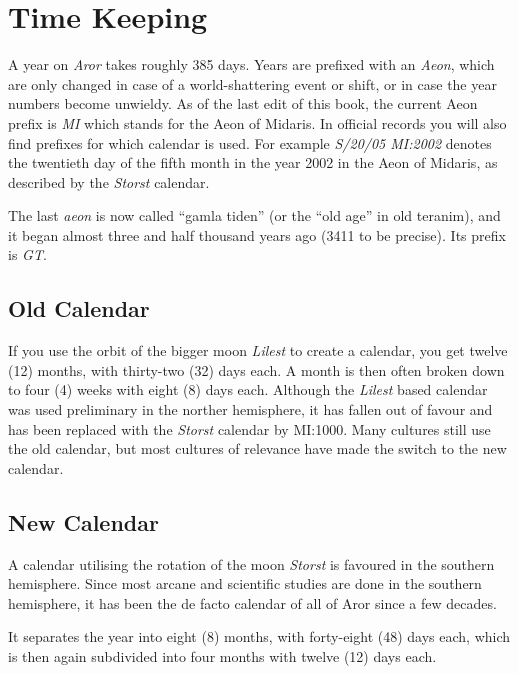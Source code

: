 \section{Time Keeping}

A year on \emph{Aror} takes roughly 385 days. Years are prefixed with an
\emph{Aeon}, which are only changed in case of a world-shattering event
or shift, or in case the year numbers become unwieldy. As of the last
edit of this book, the current Aeon prefix is \emph{MI} which stands for
the Aeon of Midaris. In official records you will also find prefixes for
which calendar is used. For example \emph{S/20/05 MI:2002} denotes the
twentieth day of the fifth month in the year 2002 in the Aeon of
Midaris, as described by the \emph{Storst} calendar.

The last \emph{aeon} is now called ``gamla tiden'' (or the ``old age'' in old
teranim), and it began almost three and half thousand years ago (3411 to be
precise). Its prefix is \emph{GT}.

\subsection{Old Calendar}
\label{sec:Old Calendar}

If you use the orbit of the bigger moon \emph{Lilest} to create a
calendar, you get twelve (12) months, with thirty-two (32) days
each. A month is then often broken down to four (4) weeks with eight
(8) days each. Although the \emph{Lilest} based calendar was used
preliminary in the norther hemisphere, it has fallen out of favour and
has been replaced with the \emph{Storst} calendar by MI:1000. Many
cultures still use the old calendar, but most cultures of relevance
have made the switch to the new calendar.

\subsection{New Calendar}
\label{sec:New Calendar}

A calendar utilising the rotation of the moon \emph{Storst} is favoured
in the southern hemisphere. Since most arcane and scientific studies are
done in the southern hemisphere, it has been the de facto calendar of all
of Aror since a few decades.

It separates the year into eight (8) months, with forty-eight (48) days
each, which is then again subdivided into four months with twelve (12)
days each.
